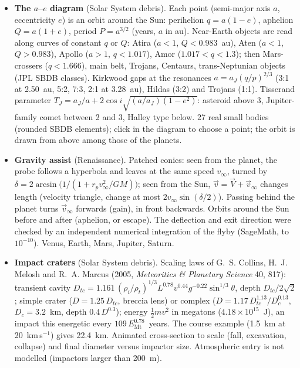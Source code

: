 \begin{itemize}
\item \textbf{The $a$--$e$ diagram} (Solar System debris). Each point (semi-major axis $a$, eccentricity $e$) is an
orbit around the Sun: perihelion $q=a(1-e)$, aphelion $Q=a(1+e)$, period $P=a^{3/2}$ (years, $a$ in au). Near-Earth
objects are read along curves of constant $q$ or $Q$: Atira ($a<1$, $Q<0.983$~au), Aten ($a<1$, $Q>0.983$), Apollo
($a>1$, $q<1.017$), Amor ($1.017<q<1.3$); then Mars-crossers ($q<1.666$), main belt, Trojans, Centaurs,
trans-Neptunian objects (JPL SBDB classes). Kirkwood gaps at the resonances $a=a_J(q/p)^{2/3}$ (3:1 at 2.50~au, 5:2,
7:3, 2:1 at 3.28~au), Hildas (3:2) and Trojans (1:1). Tisserand parameter $T_J=a_J/a+2\cos i\sqrt{(a/a_J)(1-e^2)}$:
asteroid above 3, Jupiter-family comet between 2 and 3, Halley type below. 27 real small bodies (rounded SBDB
elements); click in the diagram to choose a point; the orbit is drawn from above among those of the planets.
\item \textbf{Gravity assist} (Renaissance). Patched conics: seen from the planet, the probe follows a hyperbola and
leaves at the same speed $v_\infty$, turned by $\delta=2\arcsin\bigl(1/(1+r_pv_\infty^2/GM)\bigr)$; seen from the Sun,
$\vec v=\vec V+\vec v_\infty$ changes length (velocity triangle, change at most $2v_\infty\sin(\delta/2)$). Passing behind
the planet turns $\vec v_\infty$ forwards (gain), in front backwards. Orbits around the Sun before and after (aphelion,
or escape). The deflection and exit direction were checked by an independent numerical integration of the flyby
(SageMath, to $10^{-10}$). Venus, Earth, Mars, Jupiter, Saturn.
\item \textbf{Impact craters} (Solar System debris). Scaling laws of G.~S. Collins, H.~J. Melosh and R.~A. Marcus (2005,
\emph{Meteoritics \& Planetary Science} 40, 817): transient cavity
$D_{tc}=1.161\,(\rho_i/\rho_t)^{1/3}L^{0.78}v^{0.44}g^{-0.22}\sin^{1/3}\theta$, depth $D_{tc}/2\sqrt2$; simple crater
($D=1.25\,D_{tc}$, breccia lens) or complex ($D=1.17\,D_{tc}^{1.13}/D_c^{0.13}$, $D_c=3.2$~km, depth $0.4\,D^{0.3}$);
energy $\tfrac12mv^2$ in megatons ($4.18\times10^{15}$~J), an impact this energetic every $109\,E_\text{Mt}^{0.78}$~years.
The course example (1.5~km at 20~km\,s$^{-1}$) gives 22.4~km. Animated cross-section to scale (fall, excavation,
collapse) and final diameter versus impactor size. Atmospheric entry is not modelled (impactors larger than 200~m).

\end{itemize}
